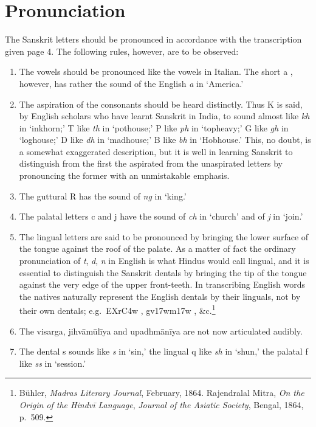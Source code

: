 \section{Pronunciation}

\s The Sanskrit letters should be pronounced in accordance with the
transcription given page 4. The following rules, however, are to be
observed:

\begin{enumerate}
\item The vowels should be pronounced like the vowels in Italian. The
  short {\dn a} , however, has rather the sound of the English
  \emph{a} in `America.'

\item The aspiration of the consonants should be heard distinctly. Thus
  {\dn K}  is said, by English scholars who have learnt Sanskrit in
  India, to sound almost like \emph{kh} in `inkhorn;' {\dn T}  like
  \emph{th} in `pothouse;' {\dn P}  like \emph{ph} in `topheavy;'
  {\dn G}  like \emph{gh} in `loghouse;' {\dn D}  like
  \emph{dh} in `madhouse;' {\dn B}  like \emph{bh} in `Hobhouse.'
  This, no doubt, is a somewhat exaggerated description, but it is well
  in learning Sanskrit to distinguish from the first the aspirated from
  the unaspirated letters by pronouncing the former with an unmistakable
  emphasis.

\item The guttural {\dn R}  has the sound of \emph{ng} in `king.'

\item The palatal letters {\dn c}  and {\dn j}  have the sound of
  \emph{ch} in `church' and of \emph{j} in `join.'

\item The lingual letters are said to be pronounced by bringing the
  lower surface of the tongue against the roof of the palate. As a
  matter of fact the ordinary pronunciation of \emph{t}, \emph{d},
  \emph{n} in English is what Hindus would call lingual, and it is
  essential to distinguish the Sanskrit dentals by bringing the tip of
  the tongue against the very edge of the upper front-teeth. In
  transcribing English words the natives naturally represent the English
  dentals by their linguals, not by their own dentals; e.g.\
  {\dn EXr\?\3C4w} , {\dn gv\317wm\?{\qvb}\317w} ,
  \&c.\footnote{Bühler, \emph{Madras Literary Journal}, February, 1864.
    Rajendralal Mitra, \emph{On the Origin of the Hindvī Language},
    \emph{Journal of the Asiatic Society}, Bengal, 1864, p.\ 509.}

\item The visarga, jihvāmūlīya and upadhmānīya are not now articulated
  audibly.

\item The dental {\dn s}  sounds like \emph{s} in `sin,' the lingual
  {\dn q} \tl{ṣ} like \emph{sh} in `shun,' the palatal {\dn f} \tl{ś} like
  \emph{ss} in `session.'
\end{enumerate}


